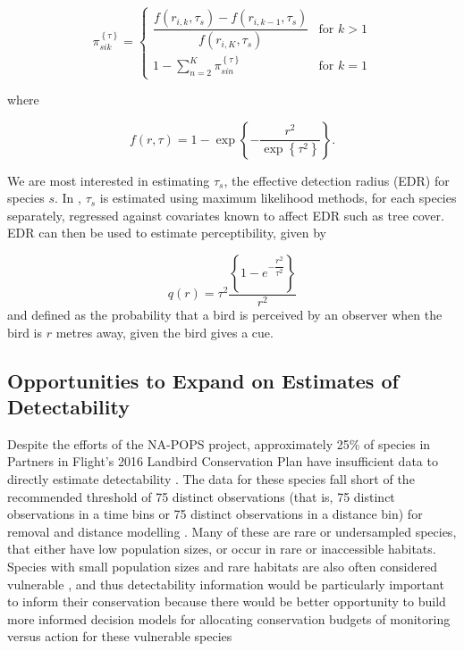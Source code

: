 \documentclass[12pt]{article}
\begin{document}
\begin{equation}\label{eq:distance}
	\pi_{sik}^{\left\{\tau\right\}} = 
	\begin{cases}
		\dfrac{f(r_{i,k}, \tau_s) - f(r_{i,k-1}, \tau_s)}{f(r_{i,K}, \tau_s)} & \text{for } k > 1 \\
		1 - \sum_{n = 2}^{K} \pi_{sin}^{\left\{\tau\right\}} & \text{for } k = 1
	\end{cases}
\end{equation}

where

$$f(r,\tau) =  1 - \exp\left\{ -\dfrac{r^2}{\exp\left\{\tau^2\right\}} \right\}.$$

\par We are most interested in estimating $\tau_s$, the effective detection radius (EDR) for species $s$. 
In \citep{solymos_calibrating_2013}, $\tau_s$ is estimated using maximum likelihood methods, for each species separately, regressed against covariates known to affect EDR such as tree cover.
EDR can then be used to estimate perceptibility, given by

\begin{equation}\label{eq:perceptibility}
	q(r) = \tau^2\dfrac{\left\{1 - e^{-\dfrac{r^2}{\tau^2}}\right\}}{r^2}
\end{equation}
and defined as the probability that a bird is perceived by an observer when the bird is $r$ metres away, given the bird gives a cue.

\subsection{Opportunities to Expand on Estimates of Detectability}

\par Despite the efforts of the NA-POPS project, approximately 25\% of species in Partners in Flight’s 2016 Landbird Conservation Plan \citep{rosenberg_partners_2016} have insufficient data to directly estimate detectability \citep{edwards_point_2023}.
The data for these species fall short of the recommended threshold of 75 distinct observations (that is, 75 distinct observations in a time bins or 75 distinct observations in a distance bin) for removal and distance modelling \citep{buckland_introduction_2001, solymos_calibrating_2013}. 
Many of these are rare or undersampled species, that either have low population sizes, or occur in rare or inaccessible habitats.
Species with small population sizes and rare habitats are also often considered vulnerable \citep{davies_synergistic_2004, gray_effects_1989, segura_specialist_2007}, and thus detectability information would be particularly important to inform their conservation because there would be better opportunity to build more informed decision models for allocating conservation budgets of monitoring versus action for these vulnerable species \citep{bennett_when_2018,bennett_how_2024}
\end{document}
